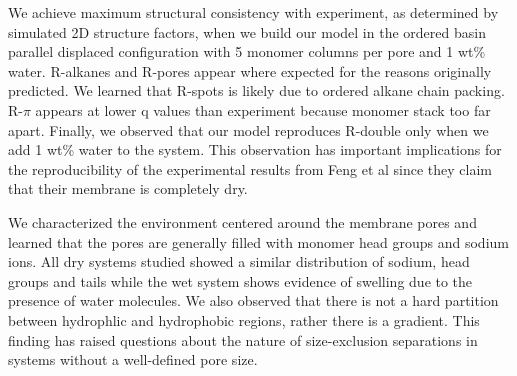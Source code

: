 \documentclass[journal=jpcbfk,manuscript=article]{achemso}
\begin{document}
  We achieve maximum structural consistency with experiment, as determined by simulated
  2D structure factors, when we build our model in the ordered basin parallel displaced
  configuration with 5 monomer columns per pore and 1 wt\% water. R-alkanes and R-pores
  appear where expected for the reasons originally predicted. We learned that R-spots
  is likely due to ordered alkane chain packing. R-$\pi$ appears at lower q values than
  experiment because monomer stack too far apart. Finally, we observed that our model
  reproduces R-double only when we add 1 wt\% water to the system. This observation has
  important implications for the reproducibility of the experimental results from Feng 
  et al since they claim that their membrane is completely dry. 

  

  We characterized the environment centered around the membrane pores and
  learned that the pores are generally filled with monomer head groups and sodium
  ions. All dry systems studied showed a similar distribution of sodium, head groups 
  and tails while the wet system shows evidence of swelling due to the presence of 
  water molecules. We also observed that there is not a hard partition between hydrophlic
  and hydrophobic regions, rather there is a gradient. This finding has raised questions
  about the nature of size-exclusion separations in systems without a well-defined pore 
  size.  

\end{document}
